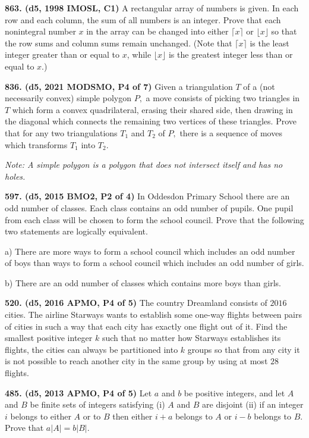 \documentclass{article}
\begin{document}
        \textbf{863. (\color{red}d5\color{black}, 1998 IMOSL, C1)} A rectangular array of numbers is given. In each row and each column, the sum of all numbers is an integer. Prove that each nonintegral number $x$ in the array can be changed into either $\lceil x\rceil$ or $\lfloor x\rfloor$ so that the row sums and column sums remain unchanged. (Note that $\lceil x\rceil$ is the least integer greater than or equal to $x$, while $\lfloor x\rfloor$ is the greatest integer less than or equal to $x$.)

        \textbf{836. (\color{red}d5\color{black}, 2021 MODSMO, P4 of 7)} Given a triangulation $T$ of a (not necessarily convex) simple polygon $P,$ a move consists of picking two triangles in $T$ which form a convex quadrilateral, erasing their shared side, then drawing in the diagonal which connects the remaining two vertices of these triangles. Prove that for any two triangulations $T_{1}$ and $T_{2}$ of $P,$ there is a sequence of moves which transforms $T_{1}$ into $T_{2}$. \medskip

        \emph{Note: A simple polygon is a polygon that does not intersect itself and has no holes.}

        \textbf{597. (\color{red}d5\color{black}, 2015 BMO2, P2 of 4)} In Oddesdon Primary School there are an odd number of classes. Each class contains an odd number of pupils. One pupil from each class will be chosen to form the school council. Prove that the following two statements are logically equivalent.

        a) There are more ways to form a school council which includes an odd number of boys than ways to form a school council which includes an odd number of girls.

        b) There are an odd number of classes which contains more boys than girls.

        \textbf{520. (\color{red}d5\color{black}, 2016 APMO, P4 of 5)} The country Dreamland consists of $2016$ cities. The airline Starways wants to establish some one-way flights between pairs of cities in such a way that each city has exactly one flight out of it. Find the smallest positive integer $k$ such that no matter how Starways establishes its flights, the cities can always be partitioned into $k$ groups so that from any city it is not possible to reach another city in the same group by using at most $28$ flights.

        \textbf{485. (\color{red}d5\color{black}, 2013 APMO, P4 of 5)} Let $a$ and $b$ be positive integers, and let $A$ and $B$ be finite sets of integers satisfying
        \smallbreak
        (i) $A$ and $B$ are disjoint
        \smallbreak
        (ii) if an integer $i$ belongs to either $A$ or to $B$ then either $i + a$ belongs to $A$ or $i - b$ belongs to $B.$
        \smallbreak
        Prove that $a \lvert A \rvert = b \lvert B \rvert.$
\end{document}
